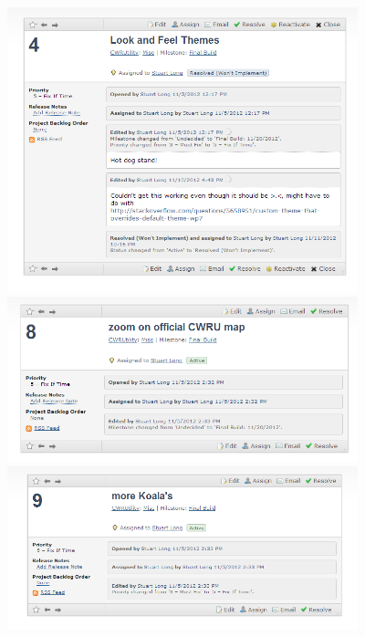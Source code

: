 \documentclass[pdftex,12pt,letter]{article}
\begin{document}
\FloatBarrier
\includegraphics[width=4in]{bugs18.png}
\FloatBarrier
\includegraphics[width=4in]{bugs19.png}
\FloatBarrier
\includegraphics[width=4in]{bugs20.png}
\FloatBarrier
{}
\end{document}
